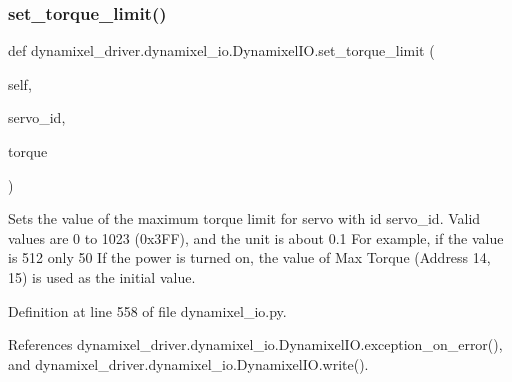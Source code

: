 \subsubsection{\texorpdfstring{set\+\_\+torque\+\_\+limit()}{set\_torque\_limit()}}
{\footnotesize\ttfamily def dynamixel\+\_\+driver.\+dynamixel\+\_\+io.\+Dynamixel\+I\+O.\+set\+\_\+torque\+\_\+limit (\begin{DoxyParamCaption}\item[{}]{self,  }\item[{}]{servo\+\_\+id,  }\item[{}]{torque }\end{DoxyParamCaption})}

\begin{DoxyVerb}Sets the value of the maximum torque limit for servo with id servo_id.
Valid values are 0 to 1023 (0x3FF), and the unit is about 0.1%
For example, if the value is 512 only 50%
If the power is turned on, the value of Max Torque (Address 14, 15) is used as the initial value.
\end{DoxyVerb}
 

Definition at line 558 of file dynamixel\+\_\+io.\+py.



References dynamixel\+\_\+driver.\+dynamixel\+\_\+io.\+Dynamixel\+I\+O.\+exception\+\_\+on\+\_\+error(), and dynamixel\+\_\+driver.\+dynamixel\+\_\+io.\+Dynamixel\+I\+O.\+write().


